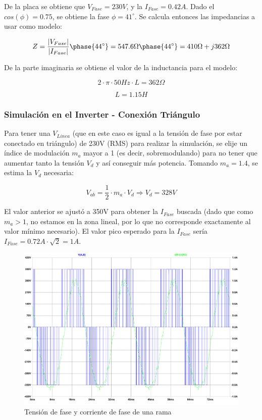 \documentclass[e4_tp3_main.tex]{subfiles}
\begin{document}
De la placa se obtiene que $V_{Fase} = 230V$, y la $I_{Fase} = 0.42A$. Dado el $cos(\phi) = 0.75$, se obtiene la fase $\phi = 41^{\circ}$. Se calcula entonces las impedancias a usar como modelo:

\[
Z = \frac{|V_{Fase}|}{|I_{Fase}|} \phase{44^{\circ}} = 547.6\Omega \phase{44^{\circ}} = 410 \Omega + j362 \Omega
\]  

De la parte imaginaria se obtiene el valor de la inductancia para el modelo:

\[
2 \cdot \pi \cdot 50Hz \cdot L = 362\Omega
\]

\[
L = 1.15H
\]

\subsubsection{Simulación en el Inverter - Conexión Triángulo}

Para tener una $V_{Linea}$ (que en este caso es igual a la tensión de fase por estar conectado en triángulo) de 230V (RMS) para realizar la simulación, se elije un índice de modulación $m_a$ mayor a 1 (es decir, sobremodulando) para no tener que aumentar tanto la tensión $V_d$ y así conseguir más potencia. Tomando $m_a = 1.4$, se estima la $V_d$ necesaria:

\[
V_{ab} = \frac{1}{2} \cdot m_a \cdot V_d \Longrightarrow V_d = 328V
\]

El valor anterior se ajustó a 350V para obtener la $I_{Fase}$ buscada (dado que como $m_a > 1$, no estamos en la zona lineal, por lo que no corresponde exactamente al valor mínimo necesario). El valor pico esperado para la $I_{Fase}$ sería $I_{Fase} = 0.72A \cdot \sqrt{2} = 1A$.

\begin{figure}[H]
\centering
\includegraphics[width=0.9\linewidth]{Imagenes/motorTriangulo.pdf}
\caption{Tensión de fase y corriente de fase de una rama}
\end{figure}
\end{document}
